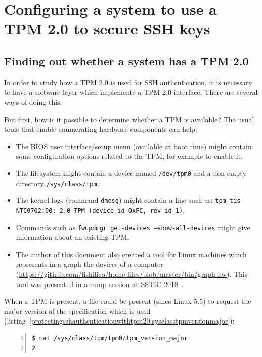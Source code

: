 \section{Configuring a system to use a TPM 2.0 to secure SSH keys}

\subsection{Finding out whether a system has a TPM 2.0}

In order to study how a TPM 2.0 is used for SSH authentication, it is
necessary to have a software layer which implements a TPM 2.0 interface.
There are several ways of doing this.

But first, how is it possible to determine whether a TPM is available?
The usual tools that enable enumerating hardware components can help:

\begin{itemize}

\item
  The BIOS user interface/setup menu (available at boot time) might
  contain some configuration options related to the TPM, for example to
  enable it.
\item
  The filesystem might contain a device named
  \texttt{/dev/tpm0} and a non-empty directory
  \texttt{/sys/class/tpm}.
\item
  The kernel logs (command \texttt{dmesg}) might
  contain a line such as:
  \texttt{tpm\_tis NTC0702:00: 2.0 TPM (device-id 0xFC, rev-id 1)}.
\item
  Commands such as
  \texttt{fwupdmgr get-devices --show-all-devices}
  might give information about an existing TPM.
\item
  The author of this document also created a tool for Linux machines
  which represents in a graph the devices of a computer
  (\url{https://github.com/fishilico/home-files/blob/master/bin/graph-hw}).
  This tool was presented in a rump session at SSTIC
  2018~\cite{protectingsshauthenticationwithtpm20:sstic2018graphhw}.
\end{itemize}

When a TPM is present, a file could be present (since Linux 5.5) to
request the major version of the specification which is used
(listing~\ref{protectingsshauthenticationwithtpm20:sysclasstpmversionmajor}):

\begin{lstlisting}[language=sh, numbers=left, caption={Query the major version of the TPM used by the system, when using TPM 2.0}, label=protectingsshauthenticationwithtpm20:sysclasstpmversionmajor]
$ cat /sys/class/tpm/tpm0/tpm_version_major
2
\end{lstlisting}


